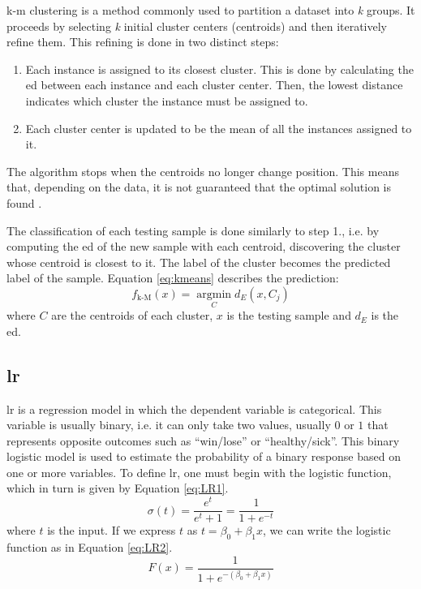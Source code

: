 \ac{k-m} clustering \cite{lloyd1982least} is a method commonly used to partition a dataset into \textit{k} groups. It proceeds by selecting \textit{k} initial cluster centers (centroids) and then iteratively refine them. This refining is done in two distinct steps:

\begin{enumerate}
    \item Each instance is assigned to its closest cluster. This is done by calculating the \ac{ed} between each instance and each cluster center. Then, the lowest distance indicates which cluster the instance must be assigned to.
    \item Each cluster center is updated to be the mean of all the instances assigned to it.
\end{enumerate}
The algorithm stops when the centroids no longer change position. This means that, depending on the data, it is not guaranteed that the optimal solution is found \cite{hartigan1979algorithm}.

The classification of each testing sample is done similarly to step 1., i.e. by computing the \ac{ed} of the new sample with each centroid, discovering the cluster whose centroid is closest to it. The label of the cluster becomes the predicted label of the sample. Equation \ref{eq:kmeans} describes the prediction:
\begin{equation}
\label{eq:kmeans}
f_{\text{k-M}}(x)= \operatorname*{argmin}_C d_{E}(x,C_j)
\end{equation}
where $C$ are the centroids of each cluster, $x$ is the testing sample and $d_E$ is the \ac{ed}.

\subsection{\acl{lr}}
\label{ssec:LogisticRegression}


\ac{lr} \cite{walker1967estimation} is a regression model in which the dependent variable is categorical. This variable is usually binary, i.e. it can only take two values, usually $0$ or $1$ that represents opposite outcomes such as ``win/lose'' or ``healthy/sick''.
This binary logistic model is used to estimate the probability of a binary response based on one or more variables.
To define \ac{lr}, one must begin with the logistic function, which in turn is given by Equation \ref{eq:LR1}.
\begin{equation}
\label{eq:LR1}
\sigma (t)={\frac {e^{t}}{e^{t}+1}}={\frac {1}{1+e^{-t}}}
\end{equation}
where $t$ is the input. If we express $t$ as $t=\beta _{0}+\beta _{1}x$, we can write the logistic function as in Equation \ref{eq:LR2}.
\begin{equation}
\label{eq:LR2}
F(x)={\frac {1}{1+e^{-(\beta _{0}+\beta _{1}x)}}}
\end{equation}


